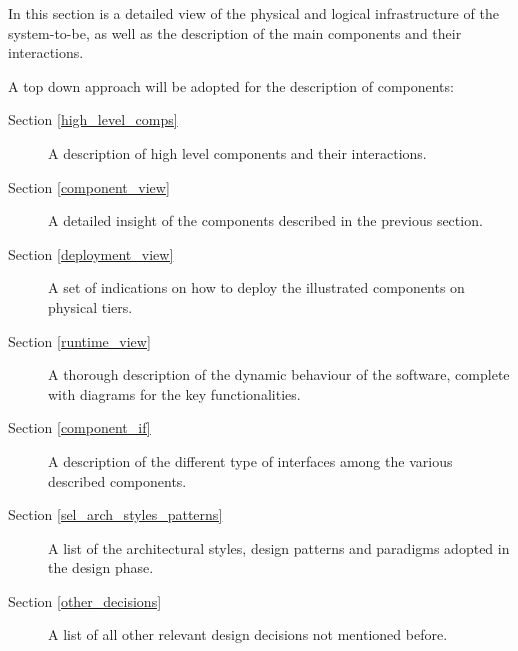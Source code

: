 In this section is a detailed view of the physical and logical infrastructure of the system-to-be, as well as the description of the main components and their interactions.

A top down approach will be adopted for the description of components:
\begin{description}
\item[Section \ref{high_level_comps}] A description of high level components and their interactions.
\item[Section \ref{component_view}] A detailed insight of the components described in the previous section.
\item[Section \ref{deployment_view}] A set of indications on how to deploy the illustrated components on physical tiers.
\item[Section \ref{runtime_view}] A thorough description of the dynamic behaviour of the software, complete with diagrams for the key functionalities.
\item[Section \ref{component_if}] A description of the different type of interfaces among the various described components.
\item[Section \ref{sel_arch_styles_patterns}] A list of the architectural styles, design patterns and paradigms adopted in the design phase.
\item[Section \ref{other_decisions}] A list of all other relevant design decisions not mentioned before.
\end{description}